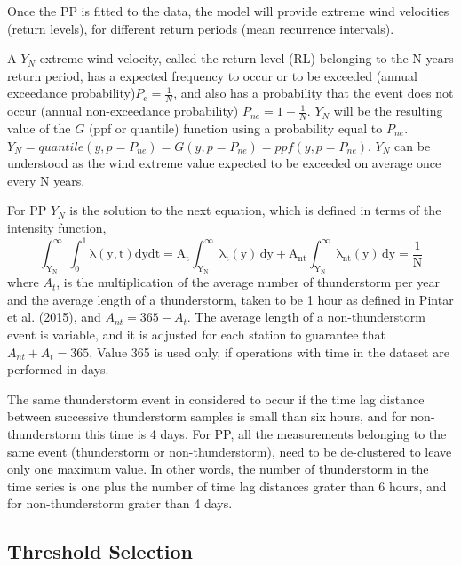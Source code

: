\documentclass[12pt,oneside]{reedthesis}
\begin{document}
Once the PP is fitted to the data, the model will provide extreme wind velocities (return levels), for different return periods (mean recurrence intervals).

A \(Y_N\) extreme wind velocity, called the return level (RL) belonging to the N-years return period, has a expected frequency to occur or to be exceeded (annual exceedance probability)\(P_e = \frac{1}{N}\), and also has a probability that the event does not occur (annual non-exceedance probability) \(P_{ne}=1-\frac{1}{N}\). \(Y_N\) will be the resulting value of the \(G\) (ppf or quantile) function using a probability equal to \(P_{ne}\). \(Y_N=quantile(y, p=P_{ne})=G(y,p=P_{ne})=ppf(y,p=P_{ne})\). \(Y_N\) can be understood as the wind extreme value expected to be exceeded on average once every N years.

For PP \(Y_N\) is the solution to the next equation, which is defined in terms of the intensity function,
\begin{equation}
  \mathrm{
          \int_{Y_N}^{\infty}\int_0^1\lambda\left( y,t\right)dydt = A_t\int_{Y_N}^{\infty}\lambda_t\left( y\right)\,dy + A_{nt}\int_{Y_N}^{\infty}\lambda_{nt}\left( y\right)\,dy = \frac{1}{N}
         }
  \label{eq:pprl}
\end{equation}
where \(A_t\), is the multiplication of the average number of thunderstorm per year and the average length of a thunderstorm, taken to be 1 hour as defined in Pintar et al. (\protect\hyperlink{ref-Pintar2015}{2015}), and \(A_{nt} = 365 - A_t\). The average length of a non-thunderstorm event is variable, and it is adjusted for each station to guarantee that \(A_{nt} + A_t = 365\). Value 365 is used only, if operations with time in the dataset are performed in days.

The same thunderstorm event in considered to occur if the time lag distance between successive thunderstorm samples is small than six hours, and for non-thunderstorm this time is 4 days. For PP, all the measurements belonging to the same event (thunderstorm or non-thunderstorm), need to be de-clustered to leave only one maximum value. In other words, the number of thunderstorm in the time series is one plus the number of time lag distances grater than 6 hours, and for non-thunderstorm grater than 4 days.

\hypertarget{thresholdselection}{%
\subsection{Threshold Selection}\label{thresholdselection}}
\end{document}
